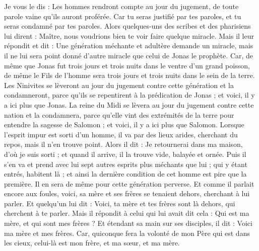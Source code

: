 \begin{multicols}{2}
Je vous le dis : Les hommes rendront compte au jour du jugement, de toute parole vaine qu'ils auront proférée.
Car tu seras justifié par tes paroles, et tu seras condamné par tes paroles.
Alors quelques-uns des scribes et des pharisiens lui dirent : Maître, nous voudrions bien te voir faire quelque miracle.
Mais il leur répondit et dit : Une génération méchante et adultère demande un miracle, mais il ne lui sera point donné d'autre miracle que celui de Jonas le prophète.
Car, de même que Jonas fut trois jours et trois nuits dans le ventre d'un grand poisson, de même le Fils de l'homme sera trois jours et trois nuits dans le sein de la terre.
Les Ninivites se lèveront au jour du jugement contre cette génération et la condamneront, parce qu'ils se repentirent à la prédication de Jonas ; et voici, il y a ici plus que Jonas.
La reine du Midi se lèvera au jour du jugement contre cette nation et la condamnera, parce qu'elle vint des extrémités de la terre pour entendre la sagesse de Salomon ; et voici, il y a ici plus que Salomon.
Lorsque l'esprit impur est sorti d'un homme, il va par des lieux arides, cherchant du repos, mais il n'en trouve point.
Alors il dit : Je retournerai dans ma maison, d'où je suis sorti ; et quand il arrive, il la trouve vide, balayée et ornée.
Puis il s'en va et prend avec lui sept autres esprits plus méchants que lui ; qui y étant entrés, habitent là ; et ainsi la dernière condition de cet homme est pire que la première. Il en sera de même pour cette génération perverse.
Et comme il parlait encore aux foules, voici, sa mère et ses frères se tenaient dehors, cherchant à lui parler.
Et quelqu'un lui dit : Voici, ta mère et tes frères sont là dehors, qui cherchent à te parler.
Mais il répondit à celui qui lui avait dit cela : Qui est ma mère, et qui sont mes frères ?
Et étendant sa main sur ses disciples, il dit : Voici ma mère et mes frères.
Car, quiconque fera la volonté de mon Père qui est dans les cieux, celui-là est mon frère, et ma sœur, et ma mère.
\TextTitle{[MYSTERES DU ROYAUME
}
\end{multicols}
